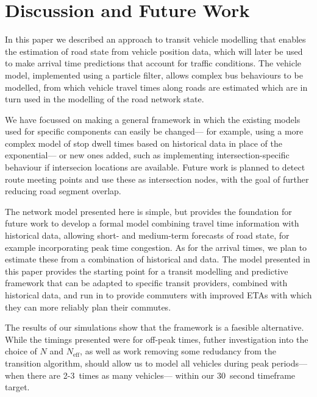 \section{Discussion and Future Work}
\label{sec:discussion}

In this paper we described an approach to transit vehicle modelling
that enables the \rt estimation of road state from vehicle position data,
which will later be used to make arrival time predictions
that account for \rt traffic conditions.
The vehicle model, implemented using a particle filter,
allows complex bus behaviours to be modelled,
from which 
vehicle travel times along roads are estimated which are in turn used 
in the modelling of the road network state.


We have focussed on making a general framework
in which the existing models used for specific components
can easily be changed---%
for example, using a more complex model of stop dwell times
based on historical data in place of the exponential---%
or new ones added, such as implementing intersection-specific behaviour
if intersecion locations are available.
Future work is planned to detect route meeting points
and use these as intersection nodes,
with the goal of further reducing road segment overlap.


The network model presented here is simple, 
but provides the foundation for future work to
develop a formal model combining \rt travel time information with historical data, 
allowing short- and medium-term forecasts of road state,
for example incorporating peak time congestion.
As for the arrival times, 
we plan to estimate these from a combination of historical 
and \rt data.
The model presented in this paper provides the starting point
for a transit modelling and predictive framework
that can be adapted to specific transit providers,
combined with historical data,
and run in \rt to provide commuters with
improved ETAs with which they can more reliably
plan their commutes.


The results of our simulations show that the framework is a 
faesible \rt alternative.
While the timings presented were for off-peak times,
futher investigation into the choice of $N$ and $N_\text{eff}$,
as well as work removing some redudancy from the transition algorithm,
should allow us to model all vehicles during peak periods---%
when there are 2-3~times as many vehicles---%
within our 30~second timeframe target.
